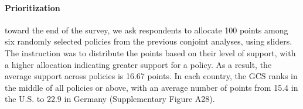 \documentclass{nature}
\makeatletter
\renewenvironment*{figure}{\@float{figure}}{\end@float}
\makeatother
\begin{document}


\paragraph{Prioritization}\label{subsubsec:prioritization} %

toward the end of the survey, we ask respondents to allocate 100 points among six randomly selected policies from the previous conjoint analyses, using sliders. The instruction was to distribute the points based on their level of support, with a higher allocation indicating greater support for a policy. %
As a result, the average support across policies is 16.67 points. %
In each country, the GCS ranks in the middle of all policies or above, with an average number of points from 15.4 in the U.S. to 22.9 in Germany (Supplementary Figure A28).%
\end{document}
